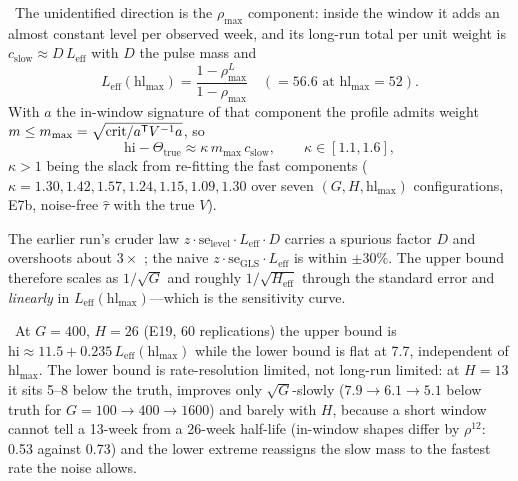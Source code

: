 \begin{law}
\label{surr:law:width}
\tagNumerical\ The unidentified direction is the $\rho_{\max}$ component: inside the window it adds an almost constant level per observed week, and its long-run total per unit weight is $c_{\mathrm{slow}} \approx D\,L_{\mathrm{eff}}$ with $D$ the pulse mass and
\begin{equation}
L_{\mathrm{eff}}(\mathrm{hl}_{\max}) = \frac{1 - \rho_{\max}^L}{1 - \rho_{\max}} \quad (= 56.6 \text{ at } \mathrm{hl}_{\max} = 52).
\label{eq:surr:leff}
\end{equation}
With $a$ the in-window signature of that component the profile admits weight $m \le m_{\max} = \sqrt{\mathrm{crit}/a^{\mathsf{T}} V^{-1}a}$, so
\begin{equation}
\mathrm{hi} - \Theta_{\mathrm{true}} \approx \kappa\,m_{\max}\,c_{\mathrm{slow}}, \qquad \kappa \in [1.1, 1.6],
\label{eq:surr:width}
\end{equation}
$\kappa > 1$ being the slack from re-fitting the fast components ($\kappa = 1.30, 1.42, 1.57, 1.24, 1.15, 1.09, 1.30$ over seven $(G, H, \mathrm{hl}_{\max})$ configurations, E7b, noise-free $\hat\tau$ with the true $V$).
\end{law}

The earlier run's cruder law $z\cdot\mathrm{se}_{\mathrm{level}}\cdot L_{\mathrm{eff}}\cdot D$ carries a spurious factor $D$ and overshoots about $3\times$ \tagRefuted; the naive $z\cdot\mathrm{se}_{\mathrm{GLS}}\cdot L_{\mathrm{eff}}$ is within $\pm 30\%$. The upper bound therefore scales as $1/\sqrt G$ and roughly $1/\sqrt{H_{\mathrm{eff}}}$ through the standard error and \emph{linearly} in $L_{\mathrm{eff}}(\mathrm{hl}_{\max})$---which is the sensitivity curve.

\begin{proposition}
\label{surr:prop:curve}
\tagNumerical\ At $G = 400$, $H = 26$ (E19, 60 replications) the upper bound is $\mathrm{hi} \approx 11.5 + 0.235\,L_{\mathrm{eff}}(\mathrm{hl}_{\max})$ while the lower bound is flat at 7.7, independent of $\mathrm{hl}_{\max}$. The lower bound is rate-resolution limited, not long-run limited: at $H = 13$ it sits 5--8 below the truth, improves only $\sqrt G$-slowly ($7.9 \to 6.1 \to 5.1$ below truth for $G = 100 \to 400 \to 1600$) and barely with $H$, because a short window cannot tell a 13-week from a 26-week half-life (in-window shapes differ by $\rho^{12}$: 0.53 against 0.73) and the lower extreme reassigns the slow mass to the fastest rate the noise allows.
\end{proposition}

